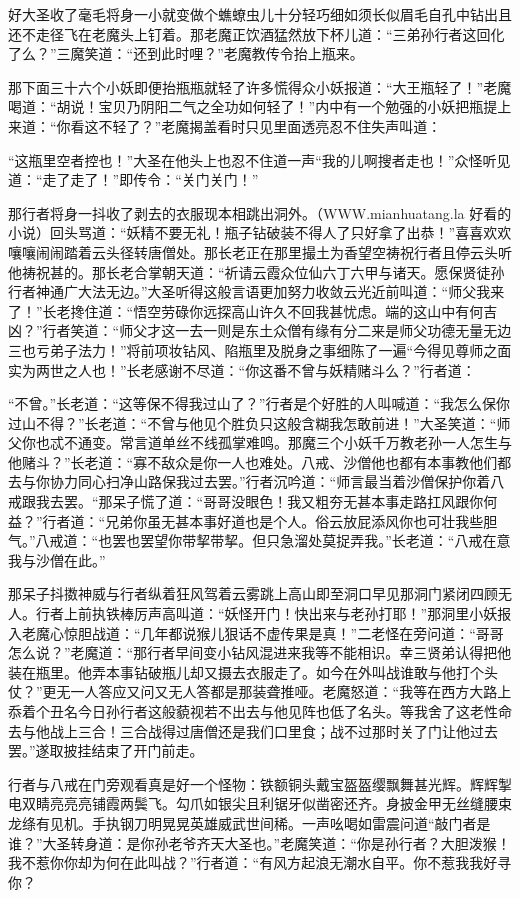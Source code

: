 \documentclass[12pt,UTF8]{ctexbook}
\begin{document}
好大圣收了毫毛将身一小就变做个蟭蟟虫儿十分轻巧细如须长似眉毛自孔中钻出且还不走径飞在老魔头上钉着。那老魔正饮酒猛然放下杯儿道：“三弟孙行者这回化了么？”三魔笑道：“还到此时哩？”老魔教传令抬上瓶来。

那下面三十六个小妖即便抬瓶瓶就轻了许多慌得众小妖报道：“大王瓶轻了！”老魔喝道：“胡说！宝贝乃阴阳二气之全功如何轻了！”内中有一个勉强的小妖把瓶提上来道：“你看这不轻了？”老魔揭盖看时只见里面透亮忍不住失声叫道：

“这瓶里空者控也！”大圣在他头上也忍不住道一声“我的儿啊搜者走也！”众怪听见道：“走了走了！”即传令：“关门关门！”

那行者将身一抖收了剥去的衣服现本相跳出洞外。（WWW.mianhuatang.la 好看的小说）回头骂道：“妖精不要无礼！瓶子钻破装不得人了只好拿了出恭！”喜喜欢欢嚷嚷闹闹踏着云头径转唐僧处。那长老正在那里撮土为香望空祷祝行者且停云头听他祷祝甚的。那长老合掌朝天道：“祈请云霞众位仙六丁六甲与诸天。愿保贤徒孙行者神通广大法无边。”大圣听得这般言语更加努力收敛云光近前叫道：“师父我来了！”长老搀住道：“悟空劳碌你远探高山许久不回我甚忧虑。端的这山中有何吉凶？”行者笑道：“师父才这一去一则是东土众僧有缘有分二来是师父功德无量无边三也亏弟子法力！”将前项妆钻风、陷瓶里及脱身之事细陈了一遍“今得见尊师之面实为两世之人也！”长老感谢不尽道：“你这番不曾与妖精赌斗么？”行者道：

“不曾。”长老道：“这等保不得我过山了？”行者是个好胜的人叫喊道：“我怎么保你过山不得？”长老道：“不曾与他见个胜负只这般含糊我怎敢前进！”大圣笑道：“师父你也忒不通变。常言道单丝不线孤掌难鸣。那魔三个小妖千万教老孙一人怎生与他赌斗？”长老道：“寡不敌众是你一人也难处。八戒、沙僧他也都有本事教他们都去与你协力同心扫净山路保我过去罢。”行者沉吟道：“师言最当着沙僧保护你着八戒跟我去罢。“那呆子慌了道：“哥哥没眼色！我又粗夯无甚本事走路扛风跟你何益？”行者道：“兄弟你虽无甚本事好道也是个人。俗云放屁添风你也可壮我些胆气。”八戒道：“也罢也罢望你带挈带挈。但只急溜处莫捉弄我。”长老道：“八戒在意我与沙僧在此。”

那呆子抖擞神威与行者纵着狂风驾着云雾跳上高山即至洞口早见那洞门紧闭四顾无人。行者上前执铁棒厉声高叫道：“妖怪开门！快出来与老孙打耶！”那洞里小妖报入老魔心惊胆战道：“几年都说猴儿狠话不虚传果是真！”二老怪在旁问道：“哥哥怎么说？”老魔道：“那行者早间变小钻风混进来我等不能相识。幸三贤弟认得把他装在瓶里。他弄本事钻破瓶儿却又摄去衣服走了。如今在外叫战谁敢与他打个头仗？”更无一人答应又问又无人答都是那装聋推哑。老魔怒道：“我等在西方大路上忝着个丑名今日孙行者这般藐视若不出去与他见阵也低了名头。等我舍了这老性命去与他战上三合！三合战得过唐僧还是我们口里食；战不过那时关了门让他过去罢。”遂取披挂结束了开门前走。

行者与八戒在门旁观看真是好一个怪物：铁额铜头戴宝盔盔缨飘舞甚光辉。辉辉掣电双睛亮亮亮铺霞两鬓飞。勾爪如银尖且利锯牙似凿密还齐。身披金甲无丝缝腰束龙绦有见机。手执钢刀明晃晃英雄威武世间稀。一声吆喝如雷震问道“敲门者是谁？”大圣转身道：是你孙老爷齐天大圣也。”老魔笑道：“你是孙行者？大胆泼猴！我不惹你你却为何在此叫战？”行者道：“有风方起浪无潮水自平。你不惹我我好寻你？
\end{document}
